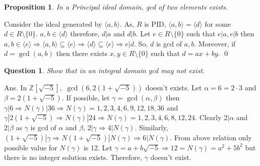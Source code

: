 \documentclass[11pt]{amsart}
\newtheorem*{qns*}{Question}
\newtheorem{proposition}[theorem]{Proposition}%
\newcommand{\ZZ}{\mathbb Z}
\newcommand{\gen}[1]{\langle#1\rangle}
\begin{document}
\begin{proposition}
In a Principal ideal domain, gcd of two elements exists.
\end{proposition}
\proof Consider the ideal generated by $\gen{a,b}.$ As, $R$ is PID, $\gen{a,b}=\gen{d}$ for some $d\in R\setminus \{0\}.$ $a,b\in \gen{d}$ therefore, $d|a$ and $d|b$. Let $e\in R\setminus \{0\}$ such that $e|a,e|b$ then $a,b \in \gen{e} \Rightarrow \gen{a,b}\subseteq \gen{e} \Rightarrow \gen{d}\subseteq \gen{e} \Rightarrow e|d.$ So, $d$ is gcd of $a,b$. Moreover, if $d=\gcd (a,b)$ then there exists $x,y\in R\setminus \{0\}$ such that $d=ax+by.$ \qed



\begin{qns*}
Show that in an integral domain gcd may not exist.
\end{qns*}
Ans. In ${\ZZ}[\sqrt{-5}],$ $\gcd (6,2(1+\sqrt{-5}))$ doesn't exists. Let $\alpha=6=2\cdot 3$ and $\beta=2(1+\sqrt{-5})$. If possible, let $\gamma=\gcd (\alpha,\beta)$ then $\gamma|6 \Rightarrow N(\gamma)|36 \Rightarrow N(\gamma)=1,2,3,4,6,9,12,18,36$ and $\gamma|2(1+\sqrt{-5}) \Rightarrow N(\gamma)|24 \Rightarrow N(\gamma)=1,2,3,4,6,8,12,24.$
Clearly $2|\alpha$ and $2|\beta$ as $\gamma$ is gcd of $\alpha$ and $\beta$, $2|\gamma \Rightarrow 4|N(\gamma)$. Similarly, $(1+\sqrt{-5})|\gamma \Rightarrow N(1+\sqrt{-5})|N(\gamma) \Rightarrow 6|N(\gamma).$ From above relation only possible value for $N(\gamma)$ is 12. Let $\gamma=a+b\sqrt{-5} \Rightarrow 12=N(\gamma)=a^2+5b^2$ but there is no integer solution exists. Therefore, $\gamma$ doesn't exist.
\end{document}
